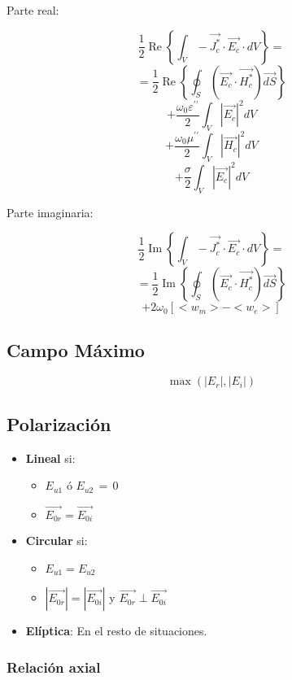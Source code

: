 \documentclass[12pt,a4paper]{article}
\begin{document}
Parte real:

\[ \frac{1}{2} \operatorname{Re}\left\{ \int_V - \vec{J_{c}^*} \cdot
\vec{E_c} \cdot dV \right\} = \]
\[ = \frac{1}{2} \operatorname{Re}\left\{ \oint_S \left(\vec{E_{c}} \cdot
\vec{H_c^*} \right) \vec{dS} \right\} \] 
\[ + \frac{\omega_0 \varepsilon^{\prime\prime}}{2} \int_V | \vec{E_c} |^2 dV \]
\[ + \frac{\omega_0 \mu^{\prime\prime}}{2} \int_V | \vec{H_c} |^2 dV \]
\[ + \frac{\sigma}{2} \int_V | \vec{E_c} |^2 dV \]

Parte imaginaria:

\[ \frac{1}{2} \operatorname{Im}\left\{ \int_V - \vec{J_{c}^*} \cdot
\vec{E_c} \cdot dV \right\} = \]
\[ = \frac{1}{2} \operatorname{Im}\left\{ \oint_S \left(\vec{E_{c}} \cdot
\vec{H_c^*} \right) \vec{dS} \right\} \] 
\[ +2\omega_0 [<w_m>-<w_e>] \]

\subsection{Campo Máximo}
\label{sub:campo_maximo}

\[ \max{\left(|E_r|, |E_i|\right)} \]

\subsection{Polarización}
\label{sub:polarizacion}

\begin{itemize}
		\item \textbf{Lineal} si:
				\begin{itemize}
						\item $ E_{u1} $ ó $ E_{u2} \, = \, 0$
						\item $ \vec{E_{0r}} = \vec{E_{0i}} $ 
						
				\end{itemize}
		\item \textbf{Circular} si:
				\begin{itemize}
						\item $ E_{u1} = E_{u2} $ 
						\item $ |\vec{E_{0r}}| = |\vec{E_{0i}}| $ y $ \vec{E_{0r}} \perp \vec{E_{0i}} $ 
				\end{itemize}
		\item \textbf{Elíptica}:
				En el resto de situaciones.
\end{itemize}

\subsubsection{Relación axial}
\label{ssub:relacion_axial}
\end{document}
